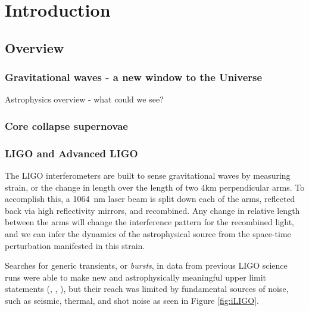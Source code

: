 \chapter{Introduction }

\section{Overview}
\subsection{Gravitational waves - a new window to the Universe}

Astrophysics overview - what could we see?  
\subsection{Core collapse supernovae} 
%
\subsection{LIGO and Advanced LIGO} 
The LIGO interferometers are built to sense gravitational waves by measuring strain, or the change in length over the length of two 4km perpendicular arms. To accomplish this, a 1064~nm laser beam is split down each of the arms, reflected back via high reflectivity mirrors, and recombined. Any change in relative length between the arms will change the interference pattern for the recombined light, and we can infer the dynamics of the astrophysical source from the space-time perturbation manifested in this strain.

Searches for generic \gw{} transients, or \textit{bursts}, in data from previous LIGO science runs were able to make new and astrophysically meaningful upper limit statements (\cite{Vela}, \cite{BurstAllSky}, \cite{GRBs}), but their reach was limited by fundamental sources of noise, such as seismic, thermal, and shot noise as seen in Figure \ref{fig:iLIGO}.

